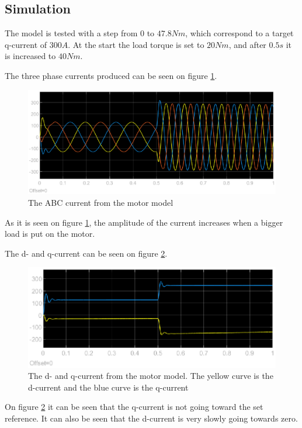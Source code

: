 \subsection{Simulation}
\label{sec:simulation}
The model is tested with a step from $0$ to $47.8 Nm$, which correspond to a target q-current of $300 A $. At the start the load torque is set to $20 Nm$, and after $0.5 s$ it is increased to $40 Nm$. 

The three phase currents produced can be seen on figure \ref{fig:iabc}.

\begin{figure}[H]
	\centering
	\includegraphics[width=0.7\linewidth]{pictures/control/iabc.eps}
	\caption{The ABC current from the motor model}
	\label{fig:iabc}
\end{figure}

As it is seen on figure \ref{fig:iabc}, the amplitude of the current increases when a bigger load is put on the motor. 

The d- and q-current can be seen on figure \ref{fig:idq}.

\begin{figure}[H]
	\centering
	\includegraphics[width=0.7\linewidth]{pictures/control/idq.eps}
	\caption{The d- and q-current from the motor model. The yellow curve is the d-current and the blue curve is the q-current}
	\label{fig:idq}
\end{figure}

On figure \ref{fig:idq} it can be seen that the q-current is not going toward the set reference. It can also be seen that the d-current is very slowly going towards zero.

